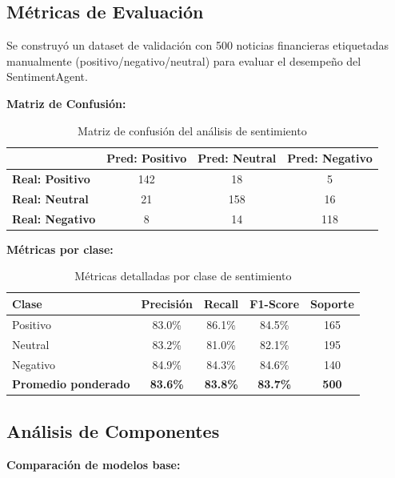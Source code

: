\documentclass[12pt,a4paper]{report}
\begin{document}
\subsection{Métricas de Evaluación}

Se construyó un dataset de validación con 500 noticias financieras etiquetadas manualmente (positivo/negativo/neutral) para evaluar el desempeño del SentimentAgent.

\textbf{Matriz de Confusión:}

\begin{table}[H]
\centering
\caption{Matriz de confusión del análisis de sentimiento}
\label{tab:confusion-matrix}
\begin{tabular}{lccc}
\toprule
 & \textbf{Pred: Positivo} & \textbf{Pred: Neutral} & \textbf{Pred: Negativo} \\
\midrule
\textbf{Real: Positivo} & 142 & 18 & 5 \\
\textbf{Real: Neutral} & 21 & 158 & 16 \\
\textbf{Real: Negativo} & 8 & 14 & 118 \\
\bottomrule
\end{tabular}
\end{table}

\textbf{Métricas por clase:}

\begin{table}[H]
\centering
\caption{Métricas detalladas por clase de sentimiento}
\label{tab:metricas-sentimiento}
\begin{tabular}{lcccc}
\toprule
\textbf{Clase} & \textbf{Precisión} & \textbf{Recall} & \textbf{F1-Score} & \textbf{Soporte} \\
\midrule
Positivo & 83.0\% & 86.1\% & 84.5\% & 165 \\
Neutral & 83.2\% & 81.0\% & 82.1\% & 195 \\
Negativo & 84.9\% & 84.3\% & 84.6\% & 140 \\
\midrule
\textbf{Promedio ponderado} & \textbf{83.6\%} & \textbf{83.8\%} & \textbf{83.7\%} & \textbf{500} \\
\bottomrule
\end{tabular}
\end{table}

\subsection{Análisis de Componentes}

\textbf{Comparación de modelos base:}
\end{document}
